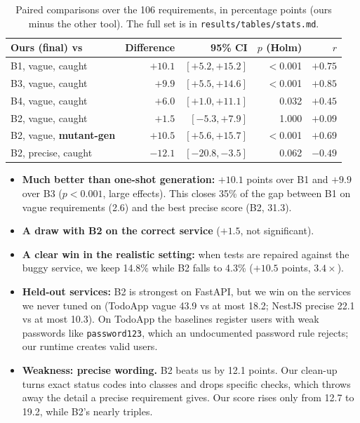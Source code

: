 \documentclass[11pt,a4paper]{article}
\begin{document}
\begin{table}[H]\centering\small
\begin{tabular}{lrrrr}\toprule
Ours (final) vs & Difference & 95\% CI & $p$ (Holm) & $r$\\\midrule
B1, vague, caught & $+10.1$ & $[+5.2, +15.2]$ & $<$0.001 & $+0.75$\\
B3, vague, caught & $+9.9$ & $[+5.5, +14.6]$ & $<$0.001 & $+0.85$\\
B4, vague, caught & $+6.0$ & $[+1.0, +11.1]$ & 0.032 & $+0.45$\\
B2, vague, caught & $+1.5$ & $[-5.3, +7.9]$ & 1.000 & $+0.09$\\
B2, vague, \textbf{mutant-gen} & $\mathbf{+10.5}$ & $[+5.6, +15.7]$ & $<$0.001 & $+0.69$\\
B2, precise, caught & $-12.1$ & $[-20.8, -3.5]$ & 0.062 & $-0.49$\\
\bottomrule\end{tabular}
\caption{Paired comparisons over the 106 requirements, in percentage points (ours minus the other tool). The full set is in \texttt{results/tables/stats.md}.}
\label{tab:stats}
\end{table}
\begin{itemize}
\item \textbf{Much better than one-shot generation:} $+10.1$ points over B1 and $+9.9$ over B3 ($p<0.001$, large effects). This closes 35\% of the gap between B1 on vague requirements (2.6) and the best precise score (B2, 31.3).
\item \textbf{A draw with B2 on the correct service} ($+1.5$, not significant).
\item \textbf{A clear win in the realistic setting:} when tests are repaired against the buggy service, we keep 14.8\% while B2 falls to 4.3\% ($+10.5$ points, $3.4\times$).
\item \textbf{Held-out services:} B2 is strongest on FastAPI, but we win on the services we never tuned on (TodoApp vague 43.9 vs at most 18.2; NestJS precise 22.1 vs at most 10.3). On TodoApp the baselines register users with weak passwords like \texttt{password123}, which an undocumented password rule rejects; our runtime creates valid users.
\item \textbf{Weakness: precise wording.} B2 beats us by 12.1 points. Our clean-up turns exact status codes into classes and drops specific checks, which throws away the detail a precise requirement gives. Our score rises only from 12.7 to 19.2, while B2's nearly triples.
\end{itemize}
\end{document}
